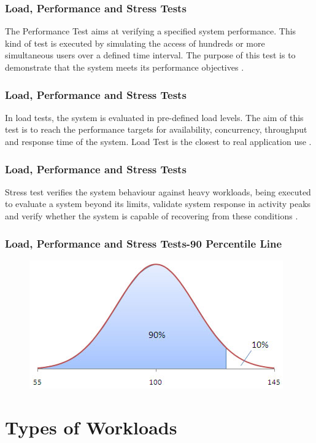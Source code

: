 \documentclass{beamer}
\begin{document}
\begin{frame}
\frametitle{Load, Performance and Stress Tests}
The Performance Test aims at verifying a specified system performance. This kind of test is executed by simulating the access of hundreds or more simultaneous users over a defined time interval. The purpose of this test is to demonstrate that the system meets its performance objectives \cite{DiLucca2006}\cite{Sandler2004}.
\end{frame}

\begin{frame}
\frametitle{Load, Performance and Stress Tests}
In load tests, the system is evaluated in pre-defined load levels. The aim of this test is to reach the performance targets for availability, concurrency, throughput and response time of the system. Load Test is the closest to real application use \cite{Molyneaux2009}.
\end{frame}


\begin{frame}
\frametitle{Load, Performance and Stress Tests}
Stress test verifies the system behaviour against heavy workloads, being executed to evaluate a system beyond its limits, validate system response in activity peaks and verify whether the system is capable of recovering from these conditions \cite{Sandler2004}.
\end{frame}

\begin{frame}
\frametitle{Load, Performance and Stress Tests-90 Percentile Line}
\begin{figure}[H]
\centering
\includegraphics[width=1\linewidth]{90percentile.png}
\end{figure}
\end{frame}

\section{Types of Workloads}
\end{document}
